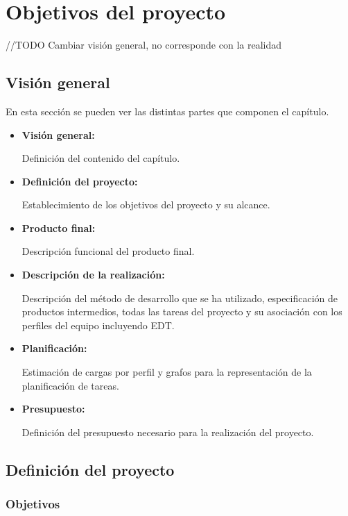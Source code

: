 \chapter{Objetivos del proyecto}

//TODO Cambiar visión general, no corresponde con la realidad

	\section{Visión general}

		En esta sección se pueden ver las distintas partes que componen el capítulo.

		\begin{itemize}
			\item \textbf{Visión general:}
				
			Definición del contenido del capítulo.
			
			\item \textbf{Definición del proyecto:}
				
			Establecimiento de los objetivos del proyecto y su alcance.

			\item \textbf{Producto final:}
				
			Descripción funcional del producto final.

			\item \textbf{Descripción de la realización:}
				
			Descripción del método de desarrollo que se ha utilizado, especificación de productos intermedios, todas las tareas del proyecto y su asociación con los perfiles del equipo incluyendo EDT.

			\item \textbf{Planificación:}
				
			Estimación de cargas por perfil y grafos para la representación de la planificación de tareas.

			\item \textbf{Presupuesto:}
				
			Definición del presupuesto necesario para la realización del proyecto.
		\end{itemize}

	\section{Definición del proyecto}

		\subsection{Objetivos}

